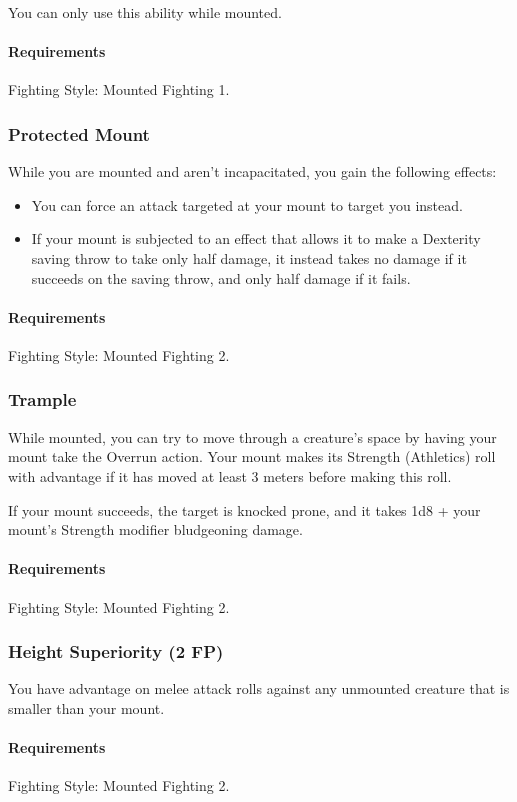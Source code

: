    You can only use this ability while mounted.
    \paragraph{Requirements} Fighting Style: Mounted Fighting 1.
\subsubsection{Protected Mount} \label{feat::protectedmount}
    While you are mounted and aren't incapacitated, you gain the following effects:
    \begin{itemize}
        \item You can force an attack targeted at your mount to target you instead.
        \item If your mount is subjected to an effect that allows it to make a Dexterity saving throw to take only half damage, it instead takes no damage if it succeeds on the saving throw, and only half damage if it fails.
    \end{itemize}
    \paragraph{Requirements} Fighting Style: Mounted Fighting 2.
\subsubsection{Trample} \label{feat::trample}
    While mounted, you can try to move through a creature's space by having your mount take the Overrun action.
    Your mount makes its Strength (Athletics) roll with advantage if it has moved at least 3 meters before making this roll.

    If your mount succeeds, the target is knocked prone, and it takes 1d8 + your mount's Strength modifier bludgeoning damage.
    \paragraph{Requirements} Fighting Style: Mounted Fighting 2.
\subsubsection{Height Superiority (2 FP)} \label{feat::heightsuperiority}
    You have advantage on melee attack rolls against any unmounted creature that is smaller than your mount.
    \paragraph{Requirements} Fighting Style: Mounted Fighting 2.
